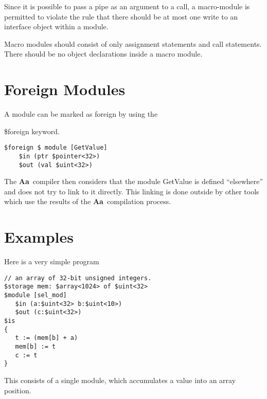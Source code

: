 \documentclass{article}
\newcommand{\Aa}{{\bf Aa}~}
\begin{document}
Since it is possible to pass a pipe as an 
argument to a call, a macro-module is permitted
to violate the rule that there should
be at most one write to an interface object
within a module.

Macro modules should consist of only assignment
statements and call statements.  There should
be no object declarations inside a macro module.

\section{Foreign Modules}


A module can be marked as foreign by using the

\$foreign keyword.
\begin{verbatim}
$foreign $ module [GetValue]
	$in (ptr $pointer<32>)
	$out (val $uint<32>)
\end{verbatim}

The \Aa compiler then considers that the module GetValue
is defined ``elsewhere'' and does not try to link to it
directly.  This linking is done outside by other tools which
use the results of the \Aa compilation process.

\section{Examples}


Here is a very simple program
\begin{verbatim}
// an array of 32-bit unsigned integers.
$storage mem: $array<1024> of $uint<32> 
$module [sel_mod]
   $in (a:$uint<32> b:$uint<10>)
   $out (c:$uint<32>)
$is
{
   t := (mem[b] + a)
   mem[b] := t
   c := t
}
\end{verbatim}
This consists of a single module, which accumulates
a value into an array position.
\end{document}
